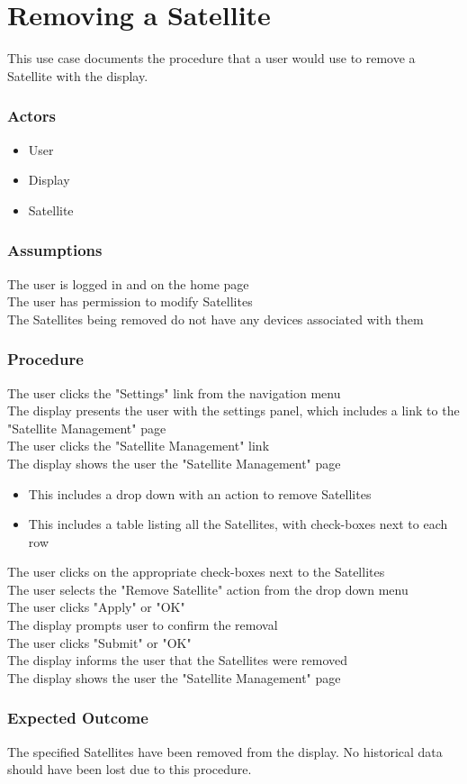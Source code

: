 \section{Removing a Satellite}

This use case documents the procedure that a user would use to remove a Satellite with the display.

\subsubsection{Actors}
\begin{itemize}
	\item User
	\item Display
	\item Satellite
\end{itemize}

\subsubsection{Assumptions}

The user is logged in and on the home page\\
The user has permission to modify Satellites\\
The Satellites being removed do not have any devices associated with them

\subsubsection{Procedure}

The user clicks the "Settings" link from the navigation menu\\
The display presents the user with the settings panel, which includes a link to the "Satellite Management" page\\
The user clicks the "Satellite Management" link\\
The display shows the user the "Satellite Management" page
\begin{itemize}
	\item This includes a drop down with an action to remove Satellites
	\item This includes a table listing all the Satellites, with check-boxes next to each row
\end{itemize}
The user clicks on the appropriate check-boxes next to the Satellites\\
The user selects the "Remove Satellite" action from the drop down menu\\
The user clicks "Apply" or "OK"\\
The display prompts user to confirm the removal\\
The user clicks "Submit" or "OK"\\
The display informs the user that the Satellites were removed\\
The display shows the user the "Satellite Management" page

\subsubsection{Expected Outcome}

The specified Satellites have been removed from the display. 
No historical data should have been lost due to this procedure.